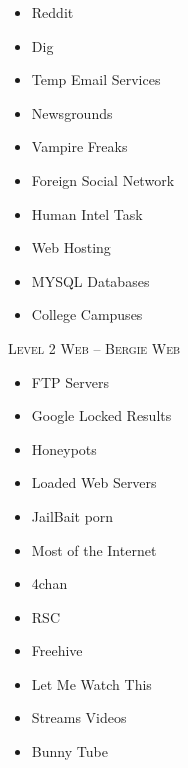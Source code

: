 \documentclass[11pt,twoside,a4paper]{book}
\begin{document}
\begin{minipage}[t]{0.3\linewidth}
	\begin{itemize}
		\setlength{\itemsep}{1pt}
		\setlength{\parskip}{0pt}
		\setlength{\parsep}{0pt}
	
		\item Reddit
		\item Dig
		\item Temp Email Services
		\item Newsgrounds
	\end{itemize}
\end{minipage}
\hfill
\begin{minipage}[t]{0.3\linewidth}
	\begin{itemize}
		\setlength{\itemsep}{1pt}
		\setlength{\parskip}{0pt}
		\setlength{\parsep}{0pt}
		
		\item Vampire Freaks
		\item Foreign Social Network
	\end{itemize}
\end{minipage}
\hfill
\begin{minipage}[t]{0.3\linewidth}
	\begin{itemize}
		\setlength{\itemsep}{1pt}
		\setlength{\parskip}{0pt}
		\setlength{\parsep}{0pt}
		
		\item Human Intel Task
		\item Web Hosting
		\item MYSQL Databases
		\item College Campuses
	\end{itemize}
\end{minipage}

\noindent
\textsc{Level 2 Web -- Bergie Web}

\begin{minipage}[t]{0.3\linewidth}
	\begin{itemize}
		\setlength{\itemsep}{1pt}
		\setlength{\parskip}{0pt}
		\setlength{\parsep}{0pt}
		
		\item FTP Servers
		\item Google Locked Results
		\item Honeypots
		\item Loaded Web Servers
		\item JailBait porn
		\item Most of the Internet
	\end{itemize}
\end{minipage}
\hfill
\begin{minipage}[t]{0.3\linewidth}
	\begin{itemize}
		\setlength{\itemsep}{1pt}
		\setlength{\parskip}{0pt}
		\setlength{\parsep}{0pt}
		
		\item 4chan
		\item RSC
		\item Freehive
		\item Let Me Watch This 
		\item Streams Videos
		\item Bunny Tube
	\end{itemize}
\end{minipage}
\end{document}
